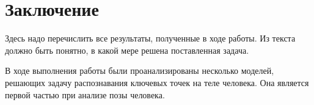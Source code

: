 \section{Заключение}
\label{sec:Chapter5} 
Здесь надо перечислить все результаты, полученные в ходе работы. Из текста должно быть понятно, в какой мере решена поставленная задача.

В ходе выполнения работы были проанализированы несколько моделей, решающих задачу распознавания ключевых точек на теле человека. Она является первой частью при анализе позы человека. 

\newpage